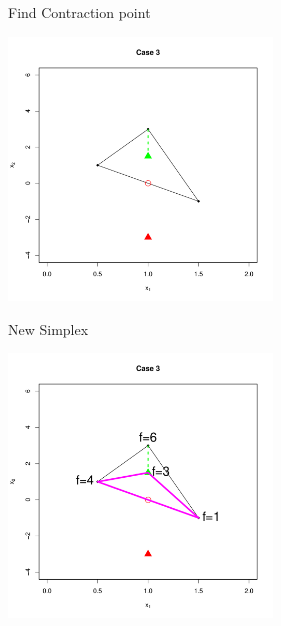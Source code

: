 \documentclass[10pt]{beamer}
\begin{document}
                                                                                              \begin{frame}{Find Contraction point}
                                                                                                \begin{center}
                                                                                                  \includegraphics[height=7cm]{RCode/nmcontraction2.pdf}
                                                                                                \end{center}
                                                                                              \end{frame}
                                                                                              \begin{frame}{New Simplex}
                                                                                                \begin{center}
                                                                                                  \includegraphics[height=7cm]{RCode/nmcontraction3.pdf}
                                                                                                \end{center}
                                                                                              \end{frame}
\end{document}
